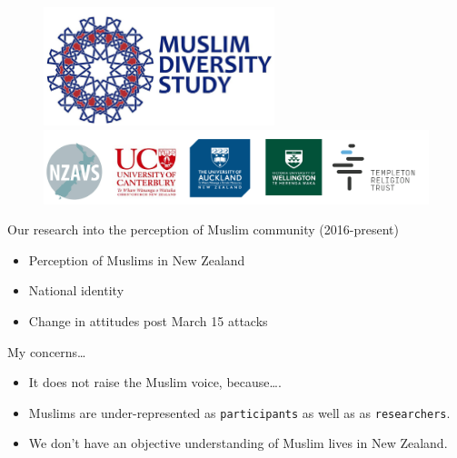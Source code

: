 \documentclass[
  ignorenonframetext,
  aspectratio=169,
]{beamer}
\providecommand{\tightlist}{%
  \setlength{\itemsep}{0pt}\setlength{\parskip}{0pt}}\usepackage{longtable,booktabs,array}
\begin{document}
\begin{frame}
\begin{figure}

\begin{minipage}{\linewidth}
\begin{center}
\includegraphics[width=0.6\textwidth,height=\textheight]{figs/mds.png}
\end{center}
\end{minipage}%
\newline
\begin{minipage}{\linewidth}
\includegraphics{figs/sponsors.png}\end{minipage}%

\end{figure}%
\end{frame}

\begin{frame}{Our research into the perception of Muslim community
(2016-present)}
\label{our-research-into-the-perception-of-muslim-community-2016-present}
\begin{itemize}[<+->]
\tightlist
\item
  Perception of Muslims in New Zealand
\item
  National identity
\item
  Change in attitudes post March 15 attacks
\end{itemize}
\end{frame}

\begin{frame}[fragile]{My concerns\ldots{}}
\label{my-concerns}
\begin{itemize}
\tightlist
\item
  It does not raise the Muslim voice, because\ldots.
\item
  Muslims are under-represented as \texttt{participants} as well as as
  \texttt{researchers}.
\item
  We don't have an objective understanding of Muslim lives in New
  Zealand.
\end{itemize}
\end{frame}
\end{document}
